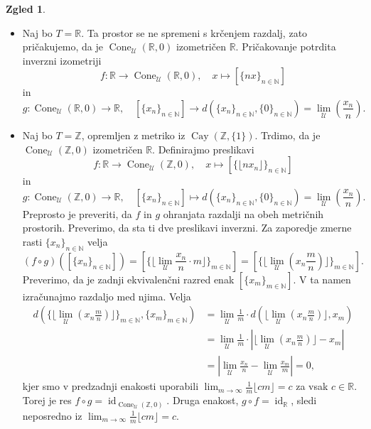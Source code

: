 \documentclass[11pt]{book}
\def\NN{\mathbb{N}}
\def\ZZ{\mathbb{Z}}
\def\RR{\mathbb{R}}
\def\UU{\mathcal{U}}
\DeclareMathOperator\Cay{Cay}
\DeclareMathOperator\id{id}
\DeclareMathOperator\Cone{Cone}
\theoremstyle{definition}
\theoremstyle{zgled}
\newtheorem*{zgled}{Zgled}
\theoremstyle{odprtproblem}
\theoremstyle{domacanaloga}
\theoremstyle{izrek}
\begin{document}
\begin{zgled}
\begin{itemize}
    \item Naj bo $T = \RR$. Ta prostor se ne spremeni s krčenjem razdalj, zato pričakujemo, da je $\Cone_\UU(\RR, 0)$ izometričen $\RR$. Pričakovanje potrdita inverzni izometriji
    \[
    f \colon \RR \to \Cone_\UU(\RR, 0), \quad x \mapsto [\{ n x \}_{n \in \NN}]
    \]
    in
    \[
    g \colon \Cone_\UU(\RR, 0) \to \RR, \quad [\{ x_n \}_{n \in \NN}] \to d(\{ x_n \}_{n \in \NN}, \{ 0 \}_{n \in \NN}) = \lim_\UU \left(\frac{x_n}{n}\right).
    \]

    \item Naj bo $T = \ZZ$, opremljen z metriko iz $\Cay(\ZZ, \{ 1 \})$. Trdimo, da je $\Cone_\UU(\ZZ, 0)$ izometričen $\RR$. Definirajmo preslikavi
    \[
    f \colon \RR \to \Cone_\UU(\ZZ, 0), \quad
    x \mapsto [\{ \lfloor n x_n \rfloor \}_{n \in \NN}]
    \]
    in
    \[
    g \colon \Cone_\UU(\ZZ, 0) \to \RR, \quad
    [\{ x_n \}_{n \in \NN}] \mapsto d(\{ x_n \}_{n \in \NN}, \{ 0 \}_{n \in \NN}) = \lim_\UU \left( \frac{x_n}{n} \right).
    \]
    Preprosto je preveriti, da $f$ in $g$ ohranjata razdalji na obeh metričnih prostorih. Preverimo, da sta ti dve preslikavi inverzni. Za zaporedje zmerne rasti $\{ x_n \}_{n \in \NN}$ velja
    \[
    (f \circ g)([\{ x_n \}_{n \in \NN}]) = [ \{ \lfloor \lim_\UU \frac{x_n}{n} \cdot m \rfloor  \}_{m \in \NN} ] = [ \{ \lfloor \lim_\UU ( x_n \frac{m}{n}) \rfloor \}_{m \in \NN} ].
    \]
    Preverimo, da je zadnji ekvivalenčni razred enak $[\{ x_m \}_{m \in \NN}]$. V ta namen izračunajmo razdaljo med njima. Velja
    \begin{align*}
    d \left( \{ \lfloor \lim_\UU ( x_n \frac{m}{n}) \rfloor \}_{m \in \NN}, \{ x_m \}_{m \in \NN} \right) &= \lim_\UU \frac{1}{m} \cdot d \left( \lfloor \lim_\UU ( x_n \frac{m}{n}) \rfloor, x_m \right) \\
    &= \lim_\UU \frac{1}{m} \cdot | \lfloor \lim_\UU ( x_n \frac{m}{n}) \rfloor - x_m | \\ 
    &= |\lim_\UU \frac{x_n}{n} - \lim_\UU \frac{x_m}{m}| = 0,
    \end{align*}
    kjer smo v predzadnji enakosti uporabili $\lim_{m \to \infty} \frac{1}{m} \lfloor c m \rfloor = c$ za vsak $c \in \RR$. Torej je res $f \circ g = \id_{\Cone_\UU(\ZZ, 0)}$. Druga enakost, $g \circ f = \id_\RR$, sledi neposredno iz $\lim_{m \to \infty} \frac{1}{m} \lfloor c m \rfloor = c$. 
\end{itemize}
\end{zgled}
\end{document}
